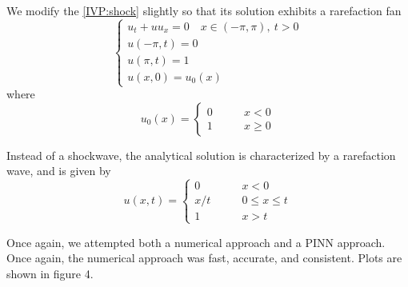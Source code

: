 \documentclass{myproject}
\begin{document}
We modify the \eqref{IVP:shock} slightly so that its solution exhibits a rarefaction fan
\begin{equation}\label{IVP:rarefaction}
    \begin{cases}
        u_t + uu_x = 0 \quad x \in (-\pi,\pi), \: t > 0 \\
        u(-\pi,t) = 0 \\
        u(\pi,t) = 1 \\
        u(x,0) = u_0(x)
    \end{cases} 
\end{equation}
where 
\begin{equation}
    u_0(x) = \begin{cases}
        0 \qquad & x < 0 \\
        1 \qquad & x \geq 0
    \end{cases}
\end{equation}

Instead of a shockwave, the analytical solution is characterized by a rarefaction wave, and is given by
\begin{equation}
    u(x,t) = \begin{cases}
        0 \qquad & x < 0 \\
        x/t \qquad & 0 \leq x \leq t \\
        1 \qquad & x > t
    \end{cases}
\end{equation}

Once again, we attempted both a numerical approach and a PINN approach. Once again, the numerical approach was fast, accurate, and consistent.  Plots are shown in figure 4.
\end{document}
